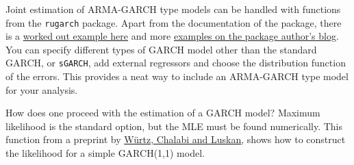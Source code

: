 \documentclass[]{book}
\begin{document}
Joint estimation of ARMA-GARCH type models can be handled with functions
from the \texttt{rugarch} package. Apart from the documentation of the
package, there is a
\href{http://unstarched.net/wp-content/uploads/2013/06/an-example-in-rugarch.pdf}{worked
out example here} and more
\href{http://unstarched.net/r-examples/rugarch/a-short-introduction-to-the-rugarch-package/}{examples
on the package author's blog}. You can specify different types of GARCH
model other than the standard GARCH, or \texttt{sGARCH}, add external
regressors and choose the distribution function of the errors. This
provides a neat way to include an ARMA-GARCH type model for your
analysis.

How does one proceed with the estimation of a GARCH model? Maximum
likelihood is the standard option, but the MLE must be found
numerically. This function from a preprint by
\href{http://www-stat.wharton.upenn.edu/~steele/Courses/956/RResources/GarchAndR/WurtzEtAlGarch.pdf}{Würtz,
Chalabi and Luskan}, shows how to construct the likelihood for a simple
GARCH(1,1) model.
\end{document}
